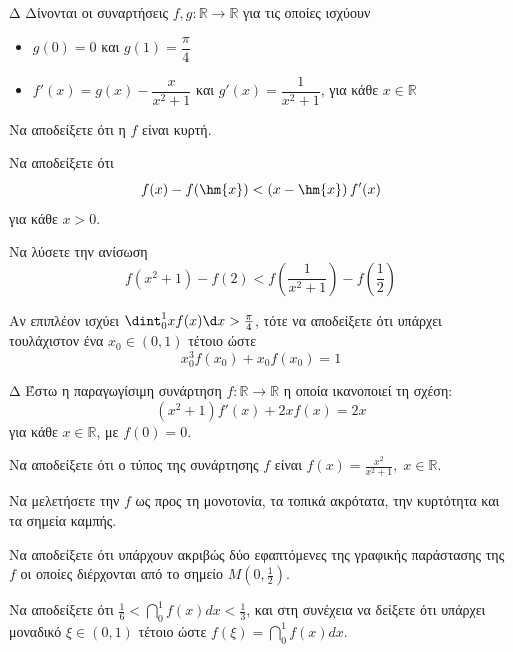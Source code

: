 \begin{thema}{Δ}
Δίνονται οι συναρτήσεις $f,g:\mathbb{R}\to\mathbb{R}$ για τις οποίες ισχύουν
\begin{itemize}
\item $g(0)=0$ και $g(1)=\dfrac{\pi}{4}$
\item $f'(x)=g(x)-\dfrac{x}{x^2+1}$ και $g'(x)=\dfrac{1}{x^2+1}$, για κάθε $x\in\mathbb{R}$
\end{itemize}
\begin{erwthma}
    \item Να αποδείξετε ότι η $f$ είναι κυρτή.
\item Να αποδείξετε ότι \[f(x)-f(\hm{x})<\left(x-\hm{x}\right)f'(x)\]
για κάθε $x>0$.
\item Να λύσετε την ανίσωση \[f\left(x^2+1\right)-f(2)<f\left(\frac{1}{x^2+1}\right)-f\left(\frac{1}{2}\right)\]
\item Αν επιπλέον ισχύει $\dint_{0}^{1}{xf(x)\d x}>\frac{\pi}{4}$, τότε να αποδείξετε ότι υπάρχει τουλάχιστον ένα $x_0\in(0,1)$ τέτοιο ώστε
\[x_0^3f(x_0)+x_0f(x_0)=1\]
\end{erwthma}
\end{thema}

\begin{thema}{Δ}
Έστω η παραγωγίσιμη συνάρτηση $f: \mathbb{R} \to \mathbb{R}$ η οποία ικανοποιεί τη σχέση:
\[ (x^2 + 1) f'(x) + 2x f(x) = 2x \]
για κάθε $x \in \mathbb{R}$, με $f(0) = 0$.
\begin{erwthma}
    \item Να αποδείξετε ότι ο τύπος της συνάρτησης $f$ είναι $\displaystyle f(x) = \frac{x^2}{x^2+1}, \; x \in \mathbb{R}$.
    \item Να μελετήσετε την $f$ ως προς τη μονοτονία, τα τοπικά ακρότατα, την κυρτότητα και τα σημεία καμπής.
    \item Να αποδείξετε ότι υπάρχουν ακριβώς δύο εφαπτόμενες της γραφικής παράστασης της $f$ οι οποίες διέρχονται από το σημείο $\displaystyle M\left(0, \frac{1}{2}\right)$.
    \item Να αποδείξετε ότι $\displaystyle \frac{1}{6} < \dint_0^1 f(x) dx < \frac{1}{3}$, και στη συνέχεια να δείξετε ότι υπάρχει μοναδικό $\xi \in (0, 1)$ τέτοιο ώστε $\displaystyle f(\xi) = \dint_0^1 f(x)dx$.
\end{erwthma}
\end{thema}

